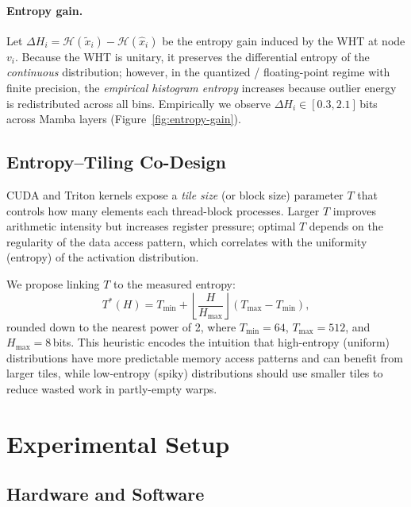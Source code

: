\documentclass{article}
\newcommand{\cH}{\mathcal{H}}         %
\begin{document}
\paragraph{Entropy gain.}
Let $\Delta H_i = \cH(\tilde{x}_i) - \cH(\hat{x}_i)$ be the entropy gain
induced by the WHT at node $v_i$.  Because the WHT is unitary, it preserves
the differential entropy of the \emph{continuous} distribution; however, in
the quantized / floating-point regime with finite precision, the \emph{empirical
histogram entropy} increases because outlier energy is redistributed across
all bins.  Empirically we observe $\Delta H_i \in [0.3, 2.1]$\,bits across
Mamba layers (Figure~\ref{fig:entropy-gain}).

\subsection{Entropy–Tiling Co-Design}
\label{sec:method:tiling}

CUDA and Triton kernels expose a \emph{tile size} (or block size) parameter
$T$ that controls how many elements each thread-block processes.  Larger $T$
improves arithmetic intensity but increases register pressure; optimal $T$
depends on the regularity of the data access pattern, which correlates with
the uniformity (entropy) of the activation distribution.

We propose linking $T$ to the measured entropy:
\begin{equation}
  T^*(H) = T_{\min} + \left\lfloor \frac{H}{H_{\max}} \right\rfloor
            (T_{\max} - T_{\min}),
  \label{eq:tile-size}
\end{equation}
rounded down to the nearest power of 2, where
$T_{\min} = 64$, $T_{\max} = 512$, and $H_{\max} = 8$\,bits.
This heuristic encodes the intuition that high-entropy (uniform) distributions
have more predictable memory access patterns and can benefit from larger tiles,
while low-entropy (spiky) distributions should use smaller tiles to reduce
wasted work in partly-empty warps.

\section{Experimental Setup}
\label{sec:exp}

\subsection{Hardware and Software}
\label{sec:exp:hw}
\end{document}
